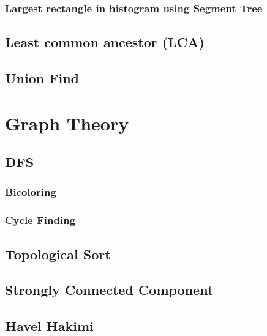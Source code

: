 \documentclass[11pt]{report}
\begin{document}
\subsection{Largest rectangle in histogram using Segment Tree}


\section{Least common ancestor (LCA)}

\section{Union Find}




\chapter{Graph Theory}
\section{DFS}
\subsection{Bicoloring}

\subsection{Cycle Finding}

\section{Topological Sort}

\section{Strongly Connected Component}

\section{Havel Hakimi}

\end{document}
